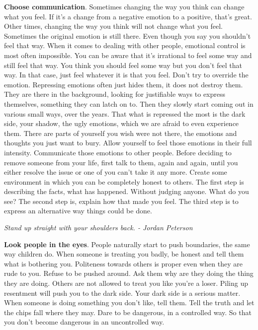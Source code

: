 \documentclass[a4paper,hidelinks]{article}
\begin{document}
\textbf{Choose communication}.
Sometimes changing the way you think can change what you feel.
If it's a change from a negative emotion to a positive, that's great.
Other times, changing the way you think will not change what you feel.
Sometimes the original emotion is still there.
Even though you say you shouldn't feel that way.
When it comes to dealing with other people, emotional control is most often impossible.
You can be aware that it's irrational to feel some way and still feel that way.
You think you should feel some way but you don't feel that way.
In that case, just feel whatever it is that you feel.
Don't try to override the emotion.
Repressing emotions often just hides them, it does not destroy them.
They are there in the background, looking for justifiable ways to express themselves, something they can latch on to.
Then they slowly start coming out in various small ways, over the years.
That what is repressed the most is the dark side, your shadow, the ugly emotions, which we are afraid to even experience them.
There are parts of yourself you wish were not there, the emotions and thoughts you just want to bury.
Allow yourself to feel those emotions in their full intensity.
Communicate those emotions to other people.
Before deciding to remove someone from your life, first talk to them, again and again, until you either resolve the issue or one of you can't take it any more.
Create some environment in which you can be completely honest to others.
The first step is describing the facts, what has happened.
Without judging anyone.
What do you see?
The second step is, explain how that made you feel.
The third step is to express an alternative way things could be done.

\newpage

\begin{center}
\textit{Stand up straight with your shoulders back. - Jordan Peterson}
\end{center}

\textbf{Look people in the eyes}.
People naturally start to push boundaries, the same way children do.
When someone is treating you badly, be honest and tell them what is bothering you.
Politeness towards others is proper even when they are rude to you.
Refuse to be pushed around.
Ask them why are they doing the thing they are doing.
Others are not allowed to treat you like you're a loser.
Piling up resentment will push you to the dark side.
Your dark side is a serious matter.
When someone is doing something you don't like, tell them.
Tell the truth and let the chips fall where they may.
Dare to be dangerous, in a controlled way.
So that you don't become dangerous in an uncontrolled way.
\end{document}
